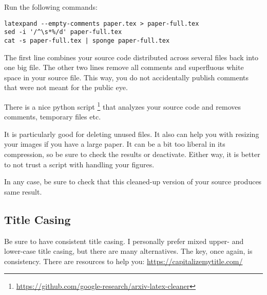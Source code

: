 Run the following commands:
\begin{Verbatim}
latexpand --empty-comments paper.tex > paper-full.tex
sed -i '/^\s*%/d' paper-full.tex
cat -s paper-full.tex | sponge paper-full.tex	
\end{Verbatim}
The first line combines your source code distributed across several files back into one big file.
The other two lines remove all comments and superfluous white space in your source file.
This way, you do not accidentally publish comments that were not meant for the public eye.

There is a nice python script%
\footnote{\url{https://github.com/google-research/arxiv-latex-cleaner}}
that analyzes your source code and removes comments, temporary files etc.

It is particularly good for deleting unused files.
It also can help you with resizing your images if you have a large paper. 
It can be a bit too liberal in its compression, so be sure to check the results or deactivate. 
Either way, it is better to not trust a script with handling your figures.

In any case, be sure to check that this cleaned-up version of your source produces same result.

\subsection{Title Casing}

Be sure to have consistent title casing.
I personally prefer mixed upper- and lower-case title casing, but there are many alternatives.
The key, once again, is consistency.
There are resources to help you: \url{https://capitalizemytitle.com/}